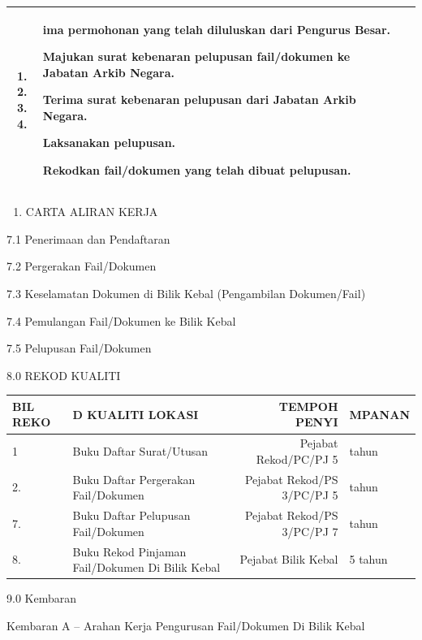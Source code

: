 \documentclass[
]{article}
\providecommand{\tightlist}{%
  \setlength{\itemsep}{0pt}\setlength{\parskip}{0pt}}
\begin{document}
\begin{longtable}[]{@{}lll@{}}
\begin{minipage}[t]{0.30\columnwidth}
\begin{enumerate}
\def\labelenumi{\arabic{enumi}.}
\setcounter{enumi}{12}
\item
\item
\item
\item
\end{enumerate}\strut
\end{minipage} & \begin{minipage}[t]{0.30\columnwidth}\raggedright
ima permohonan yang telah diluluskan dari Pengurus Besar.

Majukan surat kebenaran pelupusan fail/dokumen ke Jabatan Arkib Negara.

Terima surat kebenaran pelupusan dari Jabatan Arkib Negara.

Laksanakan pelupusan.

Rekodkan fail/dokumen yang telah dibuat pelupusan.\strut
\end{minipage}\tabularnewline
\bottomrule
\end{longtable}

\begin{enumerate}
\def\labelenumi{\arabic{enumi}.}
\setcounter{enumi}{6}
\tightlist
\item
  CARTA ALIRAN KERJA
\end{enumerate}

7.1 Penerimaan dan Pendaftaran

7.2 Pergerakan Fail/Dokumen

7.3 Keselamatan Dokumen di Bilik Kebal (Pengambilan Dokumen/Fail)

7.4 Pemulangan Fail/Dokumen ke Bilik Kebal

7.5 Pelupusan Fail/Dokumen

8.0 REKOD KUALITI

\begin{longtable}[]{@{}llrl@{}}
\toprule
BIL REKO & D KUALITI LOKASI & TEMPOH PENYI & MPANAN\tabularnewline
\midrule
\endhead
1 & Buku Daftar Surat/Utusan & Pejabat Rekod/PC/PJ 5 &
tahun\tabularnewline
2. & Buku Daftar Pergerakan Fail/Dokumen & Pejabat Rekod/PS 3/PC/PJ 5 &
tahun\tabularnewline
7. & Buku Daftar Pelupusan Fail/Dokumen & Pejabat Rekod/PS 3/PC/PJ 7 &
tahun\tabularnewline
8. & Buku Rekod Pinjaman Fail/Dokumen Di Bilik Kebal & Pejabat Bilik
Kebal & 5 tahun\tabularnewline
\bottomrule
\end{longtable}

9.0 Kembaran

Kembaran A -- Arahan Kerja Pengurusan Fail/Dokumen Di Bilik Kebal
\end{document}
